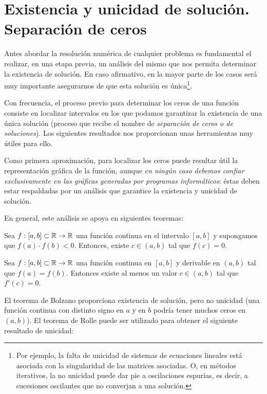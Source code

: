 \section{Existencia y unicidad de solución. Separación de ceros}
\label{sec:tema1:exist-y-unic}

Antes abordar la resolución numérica de cualquier problema es
fundamental el realizar, en una etapa previa, un análisis del mismo
que nos permita determinar la existencia de solución. En caso
afirmativo, en la mayor parte de los casos será muy importante
asegurarnos de que esta solución es única\footnote{Por ejemplo,
  la falta de unicidad de sistemas de ecuaciones lineales está
  asociada con la singularidad de las matrices asociadas. O, en
  métodos iterativos, la no unicidad puede dar pie a
  oscilaciones espurias, es decir, a sucesiones oscilantes que no
  converjan a una solución.}.

Con frecuencia, el proceso previo para determinar los ceros de una
función consiste en localizar intervalos en los que podamos
garantizar la existencia de una única solución (proceso que recibe el
nombre de \textit{separación de ceros o de soluciones}). Los
siguientes resultados nos proporcionan unas herramientas muy útiles
para ello.

Como primera aproximación, para localizar los ceros puede resultar
útil la representación gráfica de la función, aunque \textit{en
  ningún caso debemos confiar exclusivamente en las gráficas generadas
  por programas informáticos}: éstas deben estar respaldadas por un
análisis que garantice la existencia y unicidad de solución.

En general, este análisis se apoya en siguientes teoremas:
\begin{theorem}[Bolzano]
  \label{thm:bolzano}
  Sea $f:[a,b]\subset \operatorname{{\mathbb R}}\to\operatorname{{\mathbb R}}$ una función continua en el
  intervalo $[a, b]$ y supongamos que $f (a)\cdot f (b) < 0$.
  Entonces, existe $c\in(a, b)$ tal que $f (c) = 0$.
\end{theorem}

\begin{theorem}[Rolle]
  \label{thm:rolle}
  Sea $f:[a,b]\subset \operatorname{{\mathbb R}}\to\operatorname{{\mathbb R}}$ una función continua en $[a, b]$ y derivable en
  $(a, b)$ tal que $f(a) = f(b)$.
  Entonces existe al menos un valor $c \in (a, b)$ tal que $f'(c) = 0$.
\end{theorem}

El teorema de Bolzano proporciona existencia de solución,
pero no unicidad (una función continua con distinto signo en
$a$ y en $b$ podría tener muchos ceros en $(a,b)$). El teorema de
Rolle puede ser utilizado para obtener el siguiente resultado de
unicidad:

